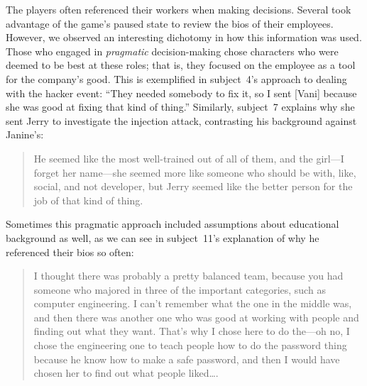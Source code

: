 \documentclass[letterpaper]{article}
\begin{document}
The players often referenced their workers when making decisions. Several
took advantage of the game's paused state to review the bios of their
employees. However, we observed an interesting
dichotomy in how this information was used.
Those who engaged in \textit{pragmatic} decision-making chose
characters who were deemed to be best at these roles; that is, they
focused on the employee as a tool for the company's good.
 This is exemplified
in subject~4's approach to dealing with the hacker event:
``They needed somebody to fix it, so
I sent [Vani] because she was good at fixing that kind
of thing.'' Similarly, subject~7 explains why she sent Jerry to investigate
the injection attack, contrasting his background against Janine's:
\begin{quote}
He seemed like the most well-trained out of all of them,
and the girl---I forget her name---she seemed more like someone
who should be with, like, social, and not developer,
but Jerry seemed like the better person for the job of that kind of thing.
\end{quote}
Sometimes this pragmatic approach included assumptions about 
educational background as well, as we can see in subject~11's 
explanation of why he referenced their bios so often:
\begin{quote}
I thought there was probably a pretty balanced team, because you had
someone who majored in three of the important categories,
such as computer engineering.
I can't remember what the one in the middle was, and
then there was another one who was good at working with people and
finding out what they want. That's why I chose here to do the---oh no,
I chose the engineering one to teach people how to do the password thing because
he know how to make a safe password, and then I would have chosen her to
find out what people liked\ldots{}.
\end{quote}
\end{document}
